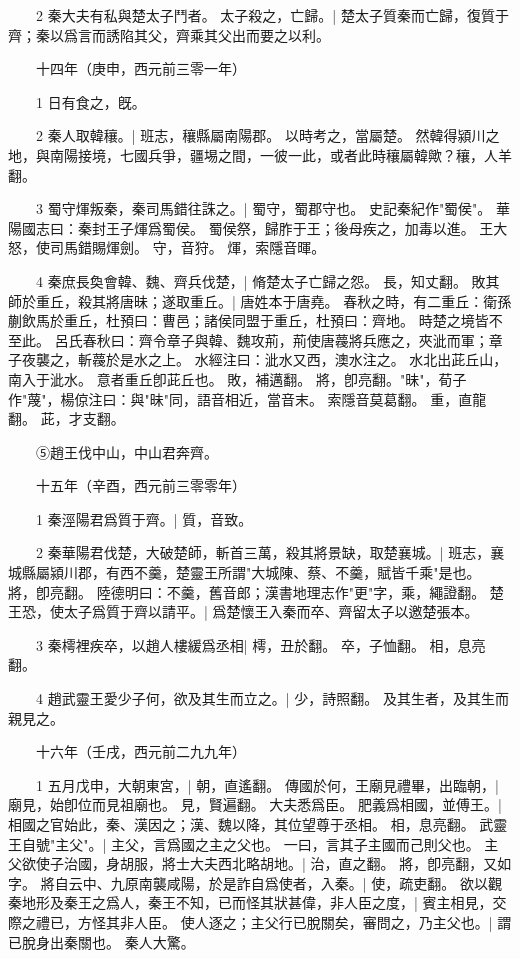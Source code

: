 　　2 秦大夫有私與楚太子鬥者。
	太子殺之，亡歸。|{
	楚太子質秦而亡歸，復質于齊；秦以爲言而誘陷其父，齊乘其父出而要之以利。
}

　　十四年（庚申，西元前三零一年）

　　1 日有食之，旣。


　　2 秦人取韓穰。|{
	班志，穰縣屬南陽郡。
	以時考之，當屬楚。
	然韓得潁川之地，與南陽接境，七國兵爭，疆埸之間，一彼一此，或者此時穰屬韓歟？穰，人羊翻。
}

　　3 蜀守煇叛秦，秦司馬錯往誅之。|{
	蜀守，蜀郡守也。
	史記秦紀作"蜀侯"。
	華陽國志曰：秦封王子煇爲蜀侯。
	蜀侯祭，歸胙于王；後母疾之，加毒以進。
	王大怒，使司馬錯賜煇劍。
	守，音狩。
	煇，索隱音暉。
}

　　4 秦庶長奐會韓、魏、齊兵伐楚，|{
	脩楚太子亡歸之怨。
	長，知丈翻。
}
敗其師於重丘，殺其將唐昧；遂取重丘。|{
	唐姓本于唐堯。
	春秋之時，有二重丘：衛孫蒯飲馬於重丘，杜預曰：曹邑；諸侯同盟于重丘，杜預曰：齊地。
	時楚之境皆不至此。
	呂氏春秋曰：齊令章子與韓、魏攻荊，荊使唐薎將兵應之，夾泚而軍；章子夜襲之，斬薎於是水之上。
	水經注曰：泚水又西，澳水注之。
	水北出茈丘山，南入于泚水。
	意者重丘卽茈丘也。
	敗，補邁翻。
	將，卽亮翻。"昧"，荀子作"蔑"，楊倞注曰：與"昧"同，語音相近，當音末。
	索隱音莫葛翻。
	重，直龍翻。
	茈，才支翻。
}

　　⑤趙王伐中山，中山君奔齊。


　　十五年（辛酉，西元前三零零年）

　　1 秦涇陽君爲質于齊。|{
	質，音致。
}

　　2 秦華陽君伐楚，大破楚師，斬首三萬，殺其將景缺，取楚襄城。|{
	班志，襄城縣屬潁川郡，有西不羹，楚靈王所謂"大城陳、蔡、不羹，賦皆千乘"是也。
	將，卽亮翻。
	陸德明曰：不羹，舊音郎；漢書地理志作"更"字，乘，繩證翻。
}
楚王恐，使太子爲質于齊以請平。|{
	爲楚懷王入秦而卒、齊留太子以邀楚張本。
}

　　3 秦樗裡疾卒，以趙人樓緩爲丞相|{
	樗，丑於翻。
	卒，子恤翻。
	相，息亮翻。
}

　　4 趙武靈王愛少子何，欲及其生而立之。|{
	少，詩照翻。
	及其生者，及其生而親見之。
}

　　十六年（壬戌，西元前二九九年）

　　1 五月戊申，大朝東宮，|{
	朝，直遙翻。
}
傳國於何，王廟見禮畢，出臨朝，|{
	廟見，始卽位而見祖廟也。
	見，賢遍翻。
}
大夫悉爲臣。
	肥義爲相國，並傅王。|{
	相國之官始此，秦、漢因之；漢、魏以降，其位望尊于丞相。
	相，息亮翻。
}
武靈王自號"主父"。|{
	主父，言爲國之主之父也。
	一曰，言其子主國而己則父也。
}
主父欲使子治國，身胡服，將士大夫西北略胡地。|{
	治，直之翻。
	將，卽亮翻，又如字。
}
將自云中、九原南襲咸陽，於是詐自爲使者，入秦。|{
	使，疏吏翻。
}
欲以觀秦地形及秦王之爲人，秦王不知，已而怪其狀甚偉，非人臣之度，|{
	賓主相見，交際之禮已，方怪其非人臣。
}
使人逐之；主父行已脫關矣，審問之，乃主父也。|{
	謂已脫身出秦關也。
}
秦人大驚。


